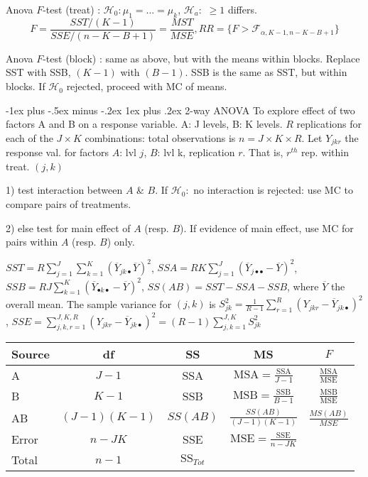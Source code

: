 \documentclass[8pt,landscape]{extarticle}
\makeatletter
\renewcommand{\subsubsection}{\@startsection{subsubsection}{3}{0mm}%
                                {-1ex plus -.5ex minus -.2ex}%
                                {1ex plus .2ex}%
                                {\normalfont\small\bfseries}}
\makeatother
\begin{document}
\begin{multicols}{3}
Anova $F$-test (treat) : $\mathcal{H}_0: \mu_1 = ...= \mu_k$, $\mathcal{H}_a:$ $\geq 1$ differs. 
$$F =\frac{ SST /(K-1) }{ SSE / (n-K -B +1)} = \frac{MST}{MSE}, RR = \{ F > \mathcal{F}_{\alpha, K-1, n-K-B+1}\} $$

Anova $F$-test (block) : same as above, but with the means within blocks. Replace SST with SSB, $(K-1)$ with $(B-1)$. SSB is the same as SST, but within blocks. If $\mathcal{H}_0$ rejected, proceed with MC of means. 

\subsubsection{2-way ANOVA}
To explore effect of two factors A and B on a response variable. A: J levels, B: K levels. $R$ replications for each of the $J \times K$ combinations: total observations is $n = J \times K \times R$. Let $Y_{jkr}$ the response val. for factors $A$: lvl $j$, $B$: lvl k, replication $r$. That is, $r^{th}$ rep. within treat. $(j,k)$

1) test interaction between $A$ \& $B$. If $\mathcal{H}_0: $ no interaction is rejected: use MC to compare pairs of treatments.

2) else test for main effect of $A$ (resp. $B$). If evidence of main effect, use MC for pairs within $A$ (resp. $B$) only.

$SST = R \sum_{j=1}^J \sum_{k=1}^K (\overline{Y}_{jk \bullet} \overline{Y})^2$,
$SSA = RK \sum_{j=1}^J (\overline{Y}_{j\bullet \bullet} -\overline{Y})^2$,
$SSB = RJ \sum_{k=1}^K (\overline{Y}_{\bullet k \bullet} -\overline{Y})^2$, $SS(AB) = SST-SSA-SSB$, where $\overline{Y}$ the overall mean. The sample variance for $(j,k)$ is $S_{jk}^2 = \frac{1}{ R-1} \sum_{r=1}^R (Y_{jkr} -\overline{Y}_{jk\bullet} )^2$, $SSE = \sum_{j,k,r =1}^{J,K,R} (Y_{jkr} - \overline{Y}_{jk \bullet} )^2 =(R-1) \sum^{J,K}_{j,k=1} S_{jk}^2$

\begin{tabular}{lcccc}
Source & df & SS & MS & $F$ \\
\hline
A & $J-1$ & SSA & $\mathrm{MSA}=\frac{\mathrm{SSA}}{J-1}$ & $\frac{\mathrm{MSA}}{\mathrm{MSE}}$ \\
B & $K-1$ & SSB & $\mathrm{MSB}=\frac{\mathrm{SSB}}{B-1}$ & $\frac{\mathrm{MSB}}{\mathrm{MSE}}$ \\
AB & $(J-1)(K-1)$ & $SS(AB)$ & $\frac{SS(AB)}{(J-1)(K-1)}$ & $\frac{MS(AB)}{MSE}$ \\
Error & $n-JK$ & SSE & $\mathrm{MSE}=\frac{\mathrm{SSE}}{n-JK}$& \\
\hline
Total& $n-1$ & $\mathrm{SS}_{Tot}$


\end{tabular}
\end{multicols}
\end{document}
